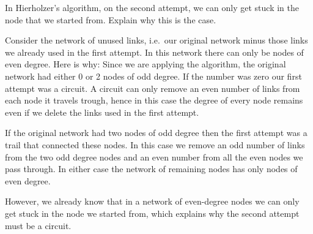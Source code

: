 In Hierholzer's algorithm, on the second attempt, we can only get stuck in the node that we started from. Explain why this is the case. 

\solution
Consider the network of unused links, i.e.~our original network minus those links we already used in the first attempt. In this network there can only be nodes of even degree. Here is why: Since we are applying the algorithm, the original network had either 0 or 2 nodes of odd degree. If the number was zero our first attempt was a circuit. A circuit can only remove an even number of links from each node it travels trough, hence in this case the degree of every node remains even if we delete the links used in the first attempt. 

If the original network had two nodes of odd degree then the first attempt was a trail that connected these nodes. In this case we remove an odd number of links from the two odd degree nodes and an even number from all the even nodes we pass through. In either case the network of remaining nodes has only nodes of even degree. 

However, we already know that in a network of even-degree nodes we can only get stuck in the node we started from, which explains why the second attempt must be a circuit. 
